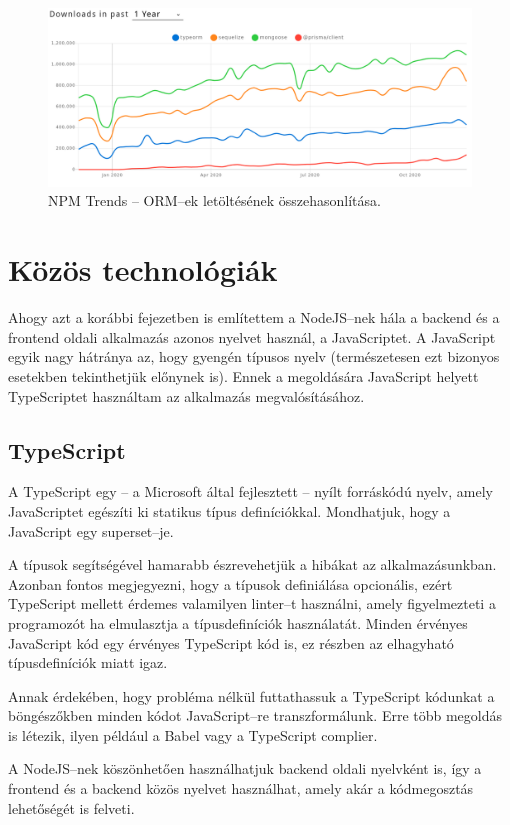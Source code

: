 \begin{figure}[!ht]
  \centering
  \includegraphics[width=150mm, keepaspectratio]{figures/orm_npm_trends.png}
  \caption{NPM Trends – ORM–ek letöltésének összehasonlítása.}
  \label{fig:ORMTrends}
\end{figure}

\section{Közös technológiák}
Ahogy azt a korábbi fejezetben is említettem a NodeJS–nek hála a backend és a frontend oldali alkalmazás azonos nyelvet használ, a JavaScriptet.
A JavaScript egyik nagy hátránya az, hogy gyengén típusos nyelv (természetesen ezt bizonyos esetekben tekinthetjük előnynek is). Ennek a megoldására JavaScript helyett TypeScriptet használtam az alkalmazás megvalósításához.

\subsection{TypeScript}

A TypeScript egy – a Microsoft által fejlesztett – nyílt forráskódú nyelv, amely JavaScriptet egészíti ki statikus típus definíciókkal. Mondhatjuk, hogy a JavaScript egy superset–je.

A típusok segítségével hamarabb észrevehetjük a hibákat az alkalmazásunkban. Azonban fontos megjegyezni, hogy a típusok definiálása opcionális, ezért TypeScript mellett érdemes valamilyen linter–t használni, amely figyelmezteti a programozót ha elmulasztja a típusdefiníciók használatát. 
Minden érvényes JavaScript kód egy érvényes TypeScript kód is, ez részben az elhagyható típusdefiníciók miatt igaz.

Annak érdekében, hogy probléma nélkül futtathassuk a TypeScript kódunkat a böngészőkben minden kódot JavaScript–re transzformálunk. Erre több megoldás is létezik, ilyen például a Babel vagy a TypeScript complier.\cite{TypeScript}

A NodeJS–nek köszönhetően használhatjuk backend oldali nyelvként is, így a frontend és a backend közös nyelvet használhat, amely akár a kódmegosztás lehetőségét is felveti.
